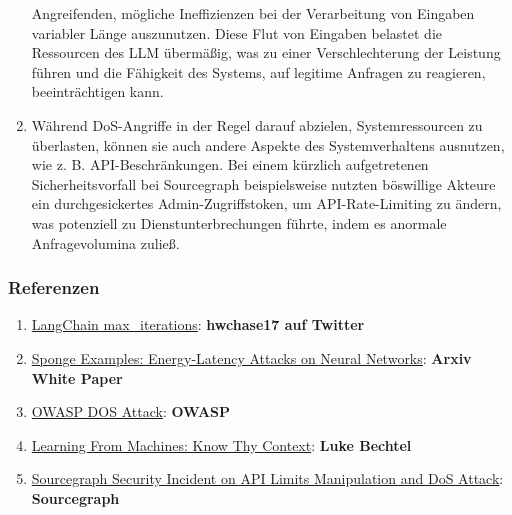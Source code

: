 \documentclass[
]{article}
\providecommand{\tightlist}{%
  \setlength{\itemsep}{0pt}\setlength{\parskip}{0pt}}
\begin{document}
\begin{enumerate}
  Angreifenden, mögliche Ineffizienzen bei der Verarbeitung von Eingaben
  variabler Länge auszunutzen. Diese Flut von Eingaben belastet die
  Ressourcen des LLM übermäßig, was zu einer Verschlechterung der
  Leistung führen und die Fähigkeit des Systems, auf legitime Anfragen
  zu reagieren, beeinträchtigen kann.
\item
  Während DoS-Angriffe in der Regel darauf abzielen, Systemressourcen zu
  überlasten, können sie auch andere Aspekte des Systemverhaltens
  ausnutzen, wie z. B. API-Beschränkungen. Bei einem kürzlich
  aufgetretenen Sicherheitsvorfall bei Sourcegraph beispielsweise
  nutzten böswillige Akteure ein durchgesickertes Admin-Zugriffstoken,
  um API-Rate-Limiting zu ändern, was potenziell zu
  Dienstunterbrechungen führte, indem es anormale Anfragevolumina
  zuließ.
\end{enumerate}

\subsubsection{Referenzen}\label{referenzen}

\begin{enumerate}
\def\labelenumi{\arabic{enumi}.}
\tightlist
\item
  \href{https://twitter.com/hwchase17/status/1608467493877579777}{LangChain
  max\_iterations}: \textbf{hwchase17 auf Twitter}
\item
  \href{https://arxiv.org/abs/2006.03463}{Sponge Examples:
  Energy-Latency Attacks on Neural Networks}: \textbf{Arxiv White Paper}
\item
  \href{https://owasp.org/www-community/attacks/Denial_of_Service}{OWASP
  DOS Attack}: \textbf{OWASP}
\item
  \href{https://lukebechtel.com/blog/lfm-know-thy-context}{Learning From
  Machines: Know Thy Context}: \textbf{Luke Bechtel}
\item
  \href{https://about.sourcegraph.com/blog/security-update-august-2023}{Sourcegraph
  Security Incident on API Limits Manipulation and DoS Attack}:
  \textbf{Sourcegraph}
\end{enumerate}
\end{document}
